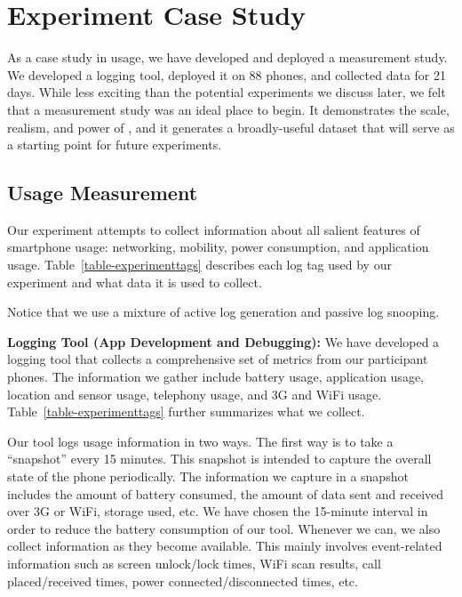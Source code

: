\section{Experiment Case Study}
\label{sec-experiment}




As a case study in \PhoneLab{} usage, we have developed and deployed a
measurement study. We developed a logging tool, deployed it on 88 phones, and
collected data for 21 days. While less exciting than the potential
experiments we discuss later, we felt that a measurement study was an ideal
place to begin. It demonstrates the scale, realism, and power of \PhoneLab{},
and it generates a broadly-useful dataset that will serve as a starting point
for future experiments.

\subsection{Usage Measurement}

Our experiment attempts to collect information about all salient features of
smartphone usage: networking, mobility, power consumption, and application
usage. Table~\ref{table-experimenttags} describes each log tag used by our
experiment and what data it is used to collect.

Notice that we use a mixture of active log generation and passive log
snooping.

{\bf Logging Tool (App Development and Debugging):} We have developed a logging
tool that collects a comprehensive set of metrics from our participant phones.
The information we gather include battery usage, application usage, location and
sensor usage, telephony usage, and 3G and WiFi usage.
Table~\ref{table-experimenttags} further summarizes what we collect.

Our tool logs usage information in two ways. The first way is to take a
``snapshot'' every 15 minutes. This snapshot is intended to capture the overall
state of the phone periodically. The information we capture in a snapshot
includes the amount of battery consumed, the amount of data sent and received
over 3G or WiFi, storage used, etc. We have chosen the 15-minute interval in
order to reduce the battery consumption of our tool. Whenever we can, we also collect information
as they become available. This mainly involves event-related information such as
screen unlock/lock times, WiFi scan results, call placed/received times, power
connected/disconnected times, etc.

